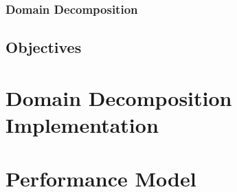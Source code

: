 \documentclass[12pt,twoside]{mitthesis-exec}
\begin{document}
\subsubsection*{Domain Decomposition}


\subsection*{Objectives}


\section*{Domain Decomposition Implementation}


\section*{Performance Model}




\begin{singlespace}


\end{singlespace}
\end{document}
